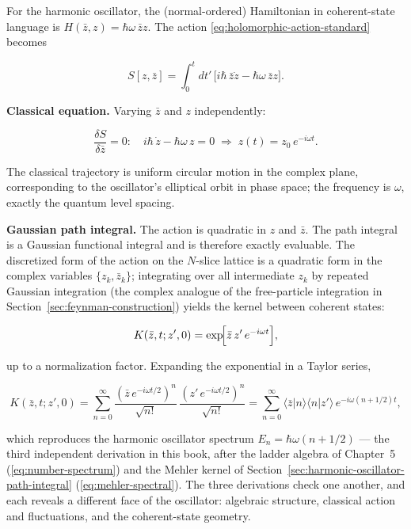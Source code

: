 For the harmonic oscillator, the (normal-ordered) Hamiltonian in coherent-state language is $H(\bar z, z) = \hbar\omega\,\bar z z$. The action \eqref{eq:holomorphic-action-standard} becomes
\begin{linenomath}
\begin{equation}
S[z,\bar z] = \int_{0}^{t} dt'\,\bigl[i\hbar\,\bar z\dot z - \hbar\omega\,\bar z z\bigr].
\label{eq:ho-coherent-action}
\end{equation}
\end{linenomath}

\medskip\noindent\textbf{Classical equation.} Varying $\bar z$ and $z$ independently:
\begin{linenomath}
\begin{equation}
\frac{\delta S}{\delta\bar z} = 0: \quad i\hbar\,\dot z - \hbar\omega\,z = 0
\;\Longrightarrow\; z(t) = z_{0}\,e^{-i\omega t}.
\label{eq:coherent-eom}
\end{equation}
\end{linenomath}
The classical trajectory is uniform circular motion in the complex plane, corresponding to the oscillator's elliptical orbit in phase space; the frequency is $\omega$, exactly the quantum level spacing.

\medskip\noindent\textbf{Gaussian path integral.} The action is quadratic in $z$ and $\bar z$. The path integral is a Gaussian functional integral and is therefore exactly evaluable. The discretized form of the action on the $N$-slice lattice is a quadratic form in the complex variables $\{z_{k},\bar z_{k}\}$; integrating over all intermediate $z_{k}$ by repeated Gaussian integration (the complex analogue of the free-particle integration in Section~\ref{sec:feynman-construction}) yields the kernel between coherent states:
\begin{linenomath}
\begin{equation}
K(\bar z, t; z',0) = \exp\!\Bigl[\bar z\,z'\,e^{-i\omega t}\Bigr],
\label{eq:coherent-ho-kernel}
\end{equation}
\end{linenomath}
up to a normalization factor. Expanding the exponential in a Taylor series,
\begin{linenomath}
\begin{equation}
K(\bar z, t; z',0) = \sum_{n=0}^{\infty}\frac{(\bar z\,e^{-i\omega t/2})^{n}}{\sqrt{n!}}\,
\frac{(z'\,e^{-i\omega t/2})^{n}}{\sqrt{n!}}
= \sum_{n=0}^{\infty}\langle\bar z|n\rangle\langle n|z'\rangle\,e^{-i\omega(n+1/2)t},
\label{eq:coherent-spectral}
\end{equation}
\end{linenomath}
which reproduces the harmonic oscillator spectrum $E_{n} = \hbar\omega(n+1/2)$ --- the third independent derivation in this book, after the ladder algebra of Chapter~5 (\eqref{eq:number-spectrum}) and the Mehler kernel of Section~\ref{sec:harmonic-oscillator-path-integral} (\eqref{eq:mehler-spectral}). The three derivations check one another, and each reveals a different face of the oscillator: algebraic structure, classical action and fluctuations, and the coherent-state geometry.

